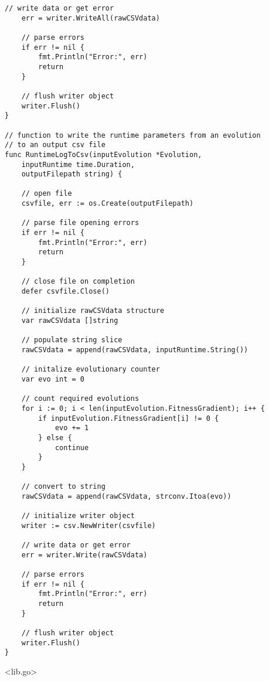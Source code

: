 \begin{lstlisting}[basicstyle=\tiny]
	// write data or get error
	err = writer.WriteAll(rawCSVdata)

	// parse errors
	if err != nil {
		fmt.Println("Error:", err)
		return
	}

	// flush writer object
	writer.Flush()
}

// function to write the runtime parameters from an evolution
// to an output csv file
func RuntimeLogToCsv(inputEvolution *Evolution, 
    inputRuntime time.Duration, 
    outputFilepath string) {

	// open file
	csvfile, err := os.Create(outputFilepath)

	// parse file opening errors
	if err != nil {
		fmt.Println("Error:", err)
		return
	}

	// close file on completion
	defer csvfile.Close()

	// initialize rawCSVdata structure
	var rawCSVdata []string

	// populate string slice
	rawCSVdata = append(rawCSVdata, inputRuntime.String())

	// initalize evolutionary counter
	var evo int = 0

	// count required evolutions
	for i := 0; i < len(inputEvolution.FitnessGradient); i++ {
		if inputEvolution.FitnessGradient[i] != 0 {
			evo += 1
		} else {
			continue
		}
	}

	// convert to string
	rawCSVdata = append(rawCSVdata, strconv.Itoa(evo))

	// initialize writer object
	writer := csv.NewWriter(csvfile)

	// write data or get error
	err = writer.Write(rawCSVdata)

	// parse errors
	if err != nil {
		fmt.Println("Error:", err)
		return
	}

	// flush writer object
	writer.Flush()
}

\end{lstlisting}

\newpage

<lib.go>

